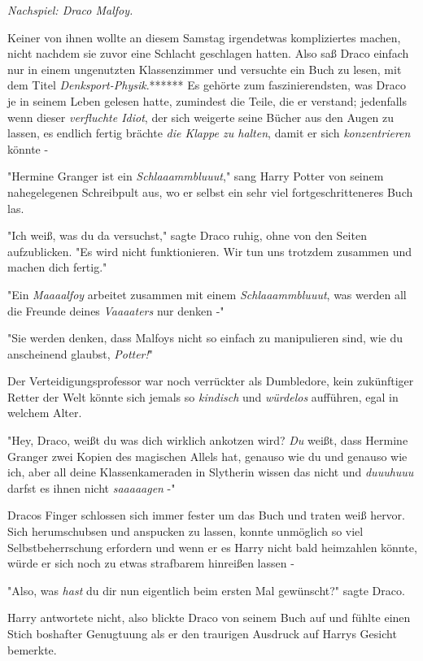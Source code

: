 {\later

\emph{Nachspiel: Draco Malfoy.}

Keiner von ihnen wollte an diesem Samstag irgendetwas kompliziertes machen, nicht nachdem sie zuvor eine Schlacht geschlagen hatten. Also saß Draco einfach nur in einem ungenutzten Klassenzimmer und versuchte ein Buch zu lesen, mit dem Titel \emph{Denksport-Physik}.****** Es gehörte zum faszinierendsten, was Draco je in seinem Leben gelesen hatte, zumindest die Teile, die er verstand; jedenfalls wenn dieser \emph{verfluchte Idiot}, der sich weigerte seine Bücher aus den Augen zu lassen, es endlich fertig brächte \emph{die Klappe zu halten}, damit er sich \emph{konzentrieren} könnte -

"Hermine Granger ist ein \emph{Schlaaammbluuut}," sang Harry Potter von seinem nahegelegenen Schreibpult aus, wo er selbst ein sehr viel fortgeschritteneres Buch las.

"Ich weiß, was du da versuchst," sagte Draco ruhig, ohne von den Seiten aufzublicken. "Es wird nicht funktionieren. Wir tun uns trotzdem zusammen und machen dich fertig."

"Ein \emph{Maaaalfoy} arbeitet zusammen mit einem \emph{Schlaaammbluuut}, was werden all die Freunde deines \emph{Vaaaaters} nur denken -"

"Sie werden denken, dass Malfoys nicht so einfach zu manipulieren sind, wie du anscheinend glaubst, \emph{Potter!}"

Der Verteidigungsprofessor war noch verrückter als Dumbledore, kein zukünftiger Retter der Welt könnte sich jemals so \emph{kindisch} und \emph{würdelos} aufführen, egal in welchem Alter.

"Hey, Draco, weißt du was dich wirklich ankotzen wird? \emph{Du} weißt, dass Hermine Granger zwei Kopien des magischen Allels hat, genauso wie du und genauso wie ich, aber all deine Klassenkameraden in Slytherin wissen das nicht und \emph{duuuhuuu} darfst es ihnen nicht \emph{saaaaagen} -"

Dracos Finger schlossen sich immer fester um das Buch und traten weiß hervor. Sich herumschubsen und anspucken zu lassen, konnte unmöglich so viel Selbstbeherrschung erfordern und wenn er es Harry nicht bald heimzahlen könnte, würde er sich noch zu etwas strafbarem hinreißen lassen -

"Also, was \emph{hast} du dir nun eigentlich beim ersten Mal gewünscht?" sagte Draco.

Harry antwortete nicht, also blickte Draco von seinem Buch auf und fühlte einen Stich boshafter Genugtuung als er den traurigen Ausdruck auf Harrys Gesicht bemerkte.

}
